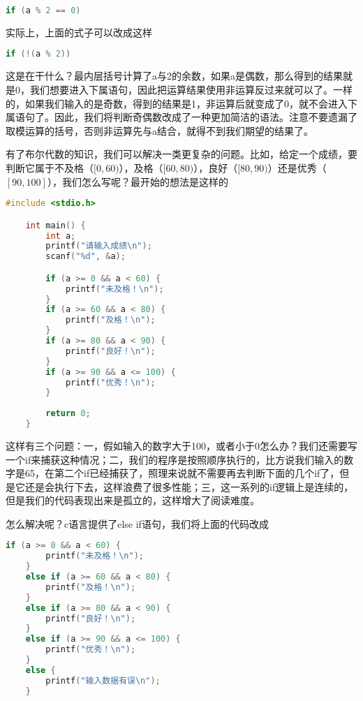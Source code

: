 \begin{lstlisting}[language=C]
    if (a % 2 == 0)
\end{lstlisting}

实际上，上面的式子可以改成这样

\begin{lstlisting}[language=C]
    if (!(a % 2))
\end{lstlisting}

这是在干什么？最内层括号计算了a与2的余数，如果a是偶数，那么得到的结果就是0，我们想要进入下属语句，因此把运算结果使用非运算反过来就可以了。一样的，如果我们输入的是奇数，得到的结果是1，非运算后就变成了0，就不会进入下属语句了。因此，我们将判断奇偶数改成了一种更加简洁的语法。注意不要遗漏了取模运算的括号，否则非运算先与a结合，就得不到我们期望的结果了。

有了布尔代数的知识，我们可以解决一类更复杂的问题。比如，给定一个成绩，要判断它属于不及格（$[0, 60)$），及格（$[60, 80)$），良好（$[80, 90)$）还是优秀（$[90, 100]$），我们怎么写呢？最开始的想法是这样的

\begin{lstlisting}[language=C]
    #include <stdio.h>

    int main() {
        int a;
        printf("请输入成绩\n");
        scanf("%d", &a);

        if (a >= 0 && a < 60) {
            printf("未及格！\n");
        }
        if (a >= 60 && a < 80) {
            printf("及格！\n");
        }
        if (a >= 80 && a < 90) {
            printf("良好！\n");
        }
        if (a >= 90 && a <= 100) {
            printf("优秀！\n");
        }
        
        return 0;
    }
\end{lstlisting}

这样有三个问题：一，假如输入的数字大于100，或者小于0怎么办？我们还需要写一个if来捕获这种情况；二，我们的程序是按照顺序执行的，比方说我们输入的数字是65，在第二个if已经捕获了，照理来说就不需要再去判断下面的几个if了，但是它还是会执行下去，这样浪费了很多性能；三，这一系列的if逻辑上是连续的，但是我们的代码表现出来是孤立的，这样增大了阅读难度。

怎么解决呢？c语言提供了else if语句，我们将上面的代码改成

\begin{lstlisting}[language=C]
    if (a >= 0 && a < 60) {
        printf("未及格！\n");
    }
    else if (a >= 60 && a < 80) {
        printf("及格！\n");
    }
    else if (a >= 80 && a < 90) {
        printf("良好！\n");
    }
    else if (a >= 90 && a <= 100) {
        printf("优秀！\n");
    }
    else {
        printf("输入数据有误\n");
    }
\end{lstlisting}

